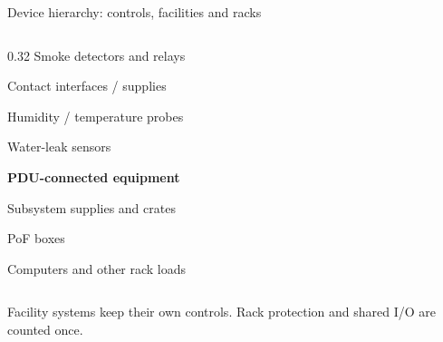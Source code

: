\begin{frame}{Device hierarchy: controls, facilities and racks}
\begin{columns}[T,onlytextwidth]
\begin{column}{0.32\textwidth}
\hspace*{0.8em}Smoke detectors and relays\par
\hspace*{0.8em}Contact interfaces / supplies\par
\hspace*{0.8em}Humidity / temperature probes\par
\hspace*{0.8em}Water-leak sensors\par\bigskip
\textbf{PDU-connected equipment}\par
\hspace*{0.8em}Subsystem supplies and crates\par
\hspace*{0.8em}PoF boxes\par
\hspace*{0.8em}Computers and other rack loads
\end{column}
\end{columns}\par\bigskip
Facility systems keep their own controls. Rack protection and shared I/O are counted once.
\end{frame}

